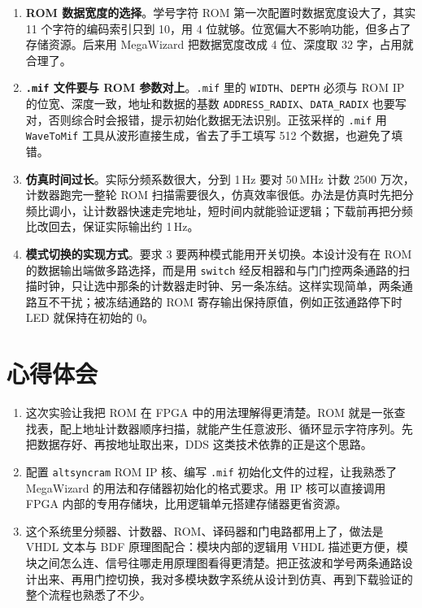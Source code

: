 \documentclass{ctexrep}
\begin{document}
\begin{enumerate}
    \item \textbf{ROM 数据宽度的选择}。学号字符 ROM 第一次配置时数据宽度设大了，其实 11 个字符的编码索引只到 10，用 4 位就够。位宽偏大不影响功能，但多占了存储资源。后来用 MegaWizard 把数据宽度改成 4 位、深度取 32 字，占用就合理了。
    \item \textbf{\texttt{.mif} 文件要与 ROM 参数对上}。\texttt{.mif} 里的 \texttt{WIDTH}、\texttt{DEPTH} 必须与 ROM IP 的位宽、深度一致，地址和数据的基数 \texttt{ADDRESS\_RADIX}、\texttt{DATA\_RADIX} 也要写对，否则综合时会报错，提示初始化数据无法识别。正弦采样的 \texttt{.mif} 用 \texttt{WaveToMif} 工具从波形直接生成，省去了手工填写 512 个数据，也避免了填错。
    \item \textbf{仿真时间过长}。实际分频系数很大，分到 1\,Hz 要对 50\,MHz 计数 2500 万次，计数器跑完一整轮 ROM 扫描需要很久，仿真效率很低。办法是仿真时先把分频比调小，让计数器快速走完地址，短时间内就能验证逻辑；下载前再把分频比改回去，保证实际输出约 1\,Hz。
    \item \textbf{模式切换的实现方式}。要求 3 要两种模式能用开关切换。本设计没有在 ROM 的数据输出端做多路选择，而是用 \texttt{switch} 经反相器和与门门控两条通路的扫描时钟，只让选中那条的计数器走时钟、另一条冻结。这样实现简单，两条通路互不干扰；被冻结通路的 ROM 寄存输出保持原值，例如正弦通路停下时 LED 就保持在初始的 0。
\end{enumerate}

\section{心得体会}

\begin{enumerate}
    \item 这次实验让我把 ROM 在 FPGA 中的用法理解得更清楚。ROM 就是一张查找表，配上地址计数器顺序扫描，就能产生任意波形、循环显示字符序列。先把数据存好、再按地址取出来，DDS 这类技术依靠的正是这个思路。
    \item 配置 \texttt{altsyncram} ROM IP 核、编写 \texttt{.mif} 初始化文件的过程，让我熟悉了 MegaWizard 的用法和存储器初始化的格式要求。用 IP 核可以直接调用 FPGA 内部的专用存储块，比用逻辑单元搭建存储器更省资源。
    \item 这个系统里分频器、计数器、ROM、译码器和门电路都用上了，做法是 VHDL 文本与 BDF 原理图配合：模块内部的逻辑用 VHDL 描述更方便，模块之间怎么连、信号往哪走用原理图看得更清楚。把正弦波和学号两条通路设计出来、再用门控切换，我对多模块数字系统从设计到仿真、再到下载验证的整个流程也熟悉了不少。
\end{enumerate}
\end{document}
